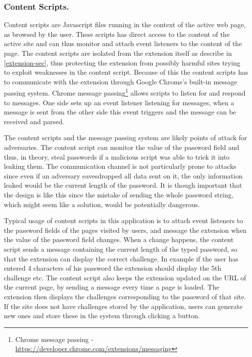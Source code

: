 \subsubsection{Content Scripts.}\label{cs}
Content scripts are Javascript files running in the context of the active web page, as browsed by the user. These scripts has direct access to the content of the active site and can thus monitor and attach event listeners to the content of the page. The content scripts are isolated from the extension itself as describe in \autoref{extension-sec}, thus protecting the extension from possibly harmful sites trying to exploit weaknesses in the content script. Because of this the content scripts has to communicate with the extension through Google Chrome's built-in message passing system. Chrome message passing\footnote{Chrome message passing - \url{https://developer.chrome.com/extensions/messaging}} allows scripts to listen for and respond to messages. One side sets up an event listener listening for messages, when a message is sent from the other side this event triggers and the message can be received and parsed. 
\par The content scripts and the message passing system are likely points of attack for adversaries. The content script can monitor the value of the password field and thus, in theory, steal passwords if a malicious script was able to trick it into leaking them. The communication channel is not particularly prone to attacks since even if an adversary eavesdropped all data sent on it, the only information leaked would be the current length of the password. It is though important that the design is like this since the mistake of sending the whole password string, which might seem like a solution, would be potentially dangerous. 
\par Typical usage of content scripts in this application is to attach event listeners to the password fields of the pages visited by users, and message the extension when the value of the password field changes. When a change happens, the content script sends a message containing the current length of the typed password, so that the extension can display the correct challenge. In example if the user has entered 4 characters of his password the extension should display the 5th challenge etc. The content script also keeps the extension updated on the URL of the current page, by sending a message every time a page is loaded. The extension then displays the challenges corresponding to the password of that site. If the site does not have challenges stored by the application, users can generate new ones and store these in the system through clicking a button.  

